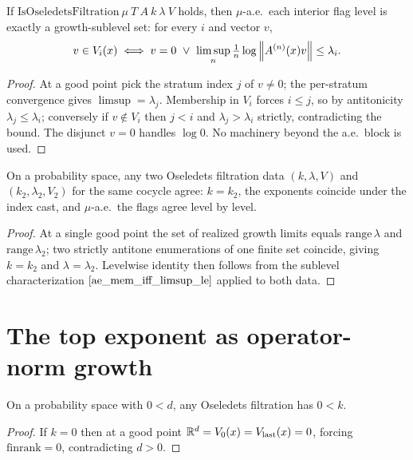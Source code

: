 \begin{theorem}\label{ae_mem_iff_limsup_le}
  \leanok
  If $\mathrm{IsOseledetsFiltration}\ \mu\ T\ A\ k\ \lambda\ V$ holds, then $\mu$-a.e.\ each interior flag level is exactly a growth-sublevel set: for every $i$ and vector $v$,
  \[ v \in V_i(x) \iff v = 0 \ \lor\ \limsup_n \tfrac1n \log\left\lVert A^{(n)}(x)v \right\rVert \le \lambda_i. \]
\end{theorem}
\begin{proof}\leanok
  At a good point pick the stratum index $j$ of $v \ne 0$; the per-stratum convergence gives $\limsup = \lambda_j$. Membership in $V_i$ forces $i \le j$, so by antitonicity $\lambda_j \le \lambda_i$; conversely if $v \notin V_i$ then $j < i$ and $\lambda_j > \lambda_i$ strictly, contradicting the bound. The disjunct $v = 0$ handles $\log 0$. No machinery beyond the a.e.\ block is used.
\end{proof}

\begin{theorem}\label{unique}
  \leanok
  On a probability space, any two Oseledets filtration data $(k, \lambda, V)$ and $(k_2, \lambda_2, V_2)$ for the same cocycle agree: $k = k_2$, the exponents coincide under the index cast, and $\mu$-a.e.\ the flags agree level by level.
\end{theorem}
\begin{proof}\leanok
  At a single good point the set of realized growth limits equals $\mathrm{range}\,\lambda$ and $\mathrm{range}\,\lambda_2$; two strictly antitone enumerations of one finite set coincide, giving $k = k_2$ and $\lambda = \lambda_2$. Levelwise identity then follows from the sublevel characterization $\ref{ae_mem_iff_limsup_le}$ applied to both data.
\end{proof}

\section{The top exponent as operator-norm growth}

\begin{lemma}[Nontriviality]\label{k_pos}
  \leanok
  On a probability space with $0 < d$, any Oseledets filtration has $0 < k$.
\end{lemma}
\begin{proof}\leanok
  If $k = 0$ then at a good point $\mathbb{R}^d = V_0(x) = V_{\mathrm{last}}(x) = 0$, forcing $\mathrm{finrank} = 0$, contradicting $d > 0$.
\end{proof}

